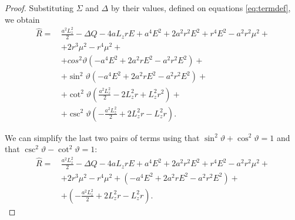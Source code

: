 \begin{proof}
	Substituting $\Sigma$ and $\Delta$ by their values, defined on equations \ref{eq:termdef}, we obtain
	\begin{align}
	\widehat{R} =\,& \frac{a^2L_z^2}{2} - \Delta Q - 4aL_zrE + a^4E^2 + 2a^2r^2E^2 + r^4E^2 - a^2r^2\mu^2 + \nonumber \\
	&+ 2r^3\mu^2 - r^4\mu^2 + \nonumber\\
	&+ cos^2\vartheta\left(-a^4E^2 + 2a^2rE^2 - a^2r^2E^2 \right) + \nonumber \\
	&+ \sin^2\vartheta\left( -a^4E^2 + 2a^2rE^2 - a^2r^2E^2 \right) + \nonumber\\
	&+ \cot^2\vartheta\left( \frac{a^2L_z^2}{2} - 2L_z^2r + L_z^2r^2 \right) + \nonumber \\
	&+ \csc^2\vartheta\left( -\frac{a^2L_z^2}{2} + 2L_z^2r - L_z^2r \right).
	\end{align}
	
	We can simplify the last two pairs of terms using that $\sin^2 \vartheta + \cos^2 \vartheta = 1$ and that $\csc^2\vartheta - \cot^2\vartheta = 1$:
	\begin{align}
	\widehat{R} =\,& \frac{a^2L_z^2}{2} - \Delta Q - 4aL_zrE + a^4E^2 + 2a^2r^2E^2 + r^4E^2 - a^2r^2\mu^2 + \nonumber \\
	&+ 2r^3\mu^2 - r^4\mu^2 + \left(-a^4E^2 + 2a^2rE^2 - a^2r^2E^2 \right) + \nonumber \\
	&+ \left( -\frac{a^2L_z^2}{2} + 2L_z^2r - L_z^2r \right).
	\end{align}
	

\end{proof}
